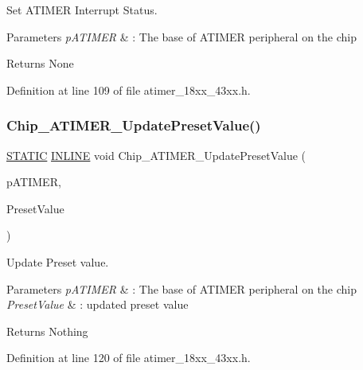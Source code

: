 Set A\+T\+I\+M\+ER Interrupt Status. 


\begin{DoxyParams}{Parameters}
{\em p\+A\+T\+I\+M\+ER} & \+: The base of A\+T\+I\+M\+ER peripheral on the chip \\
\hline
\end{DoxyParams}
\begin{DoxyReturn}{Returns}
None 
\end{DoxyReturn}


Definition at line 109 of file atimer\+\_\+18xx\+\_\+43xx.\+h.

\mbox{\label{group___a_t_i_m_e_r__18_x_x__43_x_x_gae0b0e01b311f6a0ee48c3f518ed2b4cc}} 
\subsubsection{\texorpdfstring{Chip\+\_\+\+A\+T\+I\+M\+E\+R\+\_\+\+Update\+Preset\+Value()}{Chip\_ATIMER\_UpdatePresetValue()}}
{\footnotesize\ttfamily \hyperlink{group___l_p_c___types___public___macros_ga10b2d890d871e1489bb02b7e70d9bdfb}{S\+T\+A\+T\+IC} \hyperlink{spifi__18xx__43xx_8h_a2eb6f9e0395b47b8d5e3eeae4fe0c116}{I\+N\+L\+I\+NE} void Chip\+\_\+\+A\+T\+I\+M\+E\+R\+\_\+\+Update\+Preset\+Value (\begin{DoxyParamCaption}\item[{\hyperlink{struct_l_p_c___a_t_i_m_e_r___t}{L\+P\+C\+\_\+\+A\+T\+I\+M\+E\+R\+\_\+T} $\ast$}]{p\+A\+T\+I\+M\+ER,  }\item[{uint32\+\_\+t}]{Preset\+Value }\end{DoxyParamCaption})}



Update Preset value. 


\begin{DoxyParams}{Parameters}
{\em p\+A\+T\+I\+M\+ER} & \+: The base of A\+T\+I\+M\+ER peripheral on the chip \\
\hline
{\em Preset\+Value} & \+: updated preset value \\
\hline
\end{DoxyParams}
\begin{DoxyReturn}{Returns}
Nothing 
\end{DoxyReturn}


Definition at line 120 of file atimer\+\_\+18xx\+\_\+43xx.\+h.

